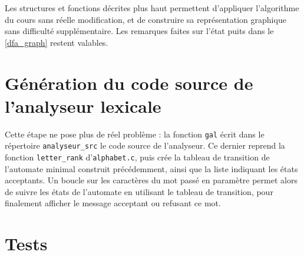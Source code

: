\documentclass[12pt, a4paper]{article}
\begin{document}
Les structures et fonctions décrites plus haut permettent d'appliquer l'algorithme du cours sans réelle modification, et de construire sa représentation graphique sans difficulté supplémentaire. Les remarques faites sur l'état puits dans le \ref{dfa_graph} restent valables.

\section{Génération du code source de l'analyseur lexicale}

Cette étape ne pose plus de réel problème : la fonction \texttt{gal} écrit dans le répertoire \texttt{analyseur\_src} le code source de l'analyseur. Ce dernier reprend la fonction \texttt{letter\_rank} d'\texttt{alphabet.c}, puis crée la tableau de transition de l'automate minimal construit précédemment, ainsi que la liste indiquant les états acceptants. Un boucle sur les caractères du mot passé en paramètre permet alors de suivre les états de l'automate en utilisant le tableau de transition, pour finalement afficher le message acceptant ou refusant ce mot. 

\section{Tests}
\end{document}
